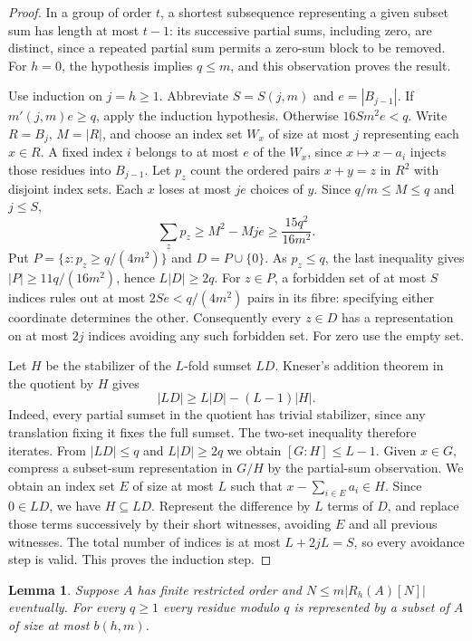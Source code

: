 \documentclass[11pt,reqno]{amsart}
\newtheorem{lemma}[theorem]{Lemma}
\theoremstyle{definition}
\theoremstyle{remark}
\begin{document}
\begin{proof}
In a group of order \(t\), a shortest subsequence representing a given
subset sum has length at most \(t-1\): its successive partial sums,
including zero, are distinct, since a repeated partial sum permits a
zero-sum block to be removed. For \(h=0\), the hypothesis implies
\(q\le m\), and this observation proves the result.

Use induction on \(j=h\ge1\). Abbreviate \(S=S(j,m)\) and \(e=|B_{j-1}|\).
If \(m'(j,m)e\ge q\), apply the induction hypothesis. Otherwise
\(16Sm^2e<q\). Write \(R=B_j\), \(M=|R|\), and choose an index set
\(W_x\) of size at most \(j\) representing each \(x\in R\).
A fixed index \(i\) belongs to at most \(e\) of the \(W_x\), since
\(x\mapsto x-a_i\) injects those residues into \(B_{j-1}\).
Let \(p_z\) count the ordered pairs \(x+y=z\) in \(R^2\) with disjoint
index sets. Each \(x\) loses at most \(je\) choices of \(y\). Since
\(q/m\le M\le q\) and \(j\le S\),
\[
 \sum_z p_z\ge M^2-Mje\ge\frac{15q^2}{16m^2}.
\]
Put \(P=\{z:p_z\ge q/(4m^2)\}\) and \(D=P\cup\{0\}\).
As \(p_z\le q\), the last inequality gives
\(|P|\ge 11q/(16m^2)\), hence \(L|D|\ge2q\).
For \(z\in P\), a forbidden set of at most \(S\) indices rules out at
most \(2Se<q/(4m^2)\) pairs in its fibre: specifying either coordinate
determines the other. Consequently every \(z\in D\) has a representation
on at most \(2j\) indices avoiding any such forbidden set. For zero use
the empty set.

Let \(H\) be the stabilizer of the \(L\)-fold sumset \(LD\).
Kneser's addition theorem in the quotient by \(H\) gives
\[
 |LD|\ge L|D|-(L-1)|H|.
\]
Indeed, every partial sumset in the quotient has trivial stabilizer,
since any translation fixing it fixes the full sumset. The two-set
inequality therefore iterates. From \(|LD|\le q\) and \(L|D|\ge 2q\)
we obtain \([G:H]\le L-1\). Given \(x\in G\), compress a subset-sum
representation in \(G/H\) by the partial-sum observation. We obtain an
index set \(E\) of size at most \(L\) such that \(x-\sum_{i\in E}a_i\in H\).
Since \(0\in LD\), we have \(H\subseteq LD\). Represent the difference
by \(L\) terms of \(D\), and replace those terms successively by their
short witnesses, avoiding \(E\) and all previous witnesses. The total
number of indices is at most \(L+2jL=S\), so every avoidance step is
valid. This proves the induction step.
\end{proof}

\begin{lemma}\label{lem:modular-lift}
Suppose \(A\) has finite restricted order and
\(N\le m|R_h(A)[N]|\) eventually. For every \(q\ge1\) every residue
modulo \(q\) is represented by a subset of \(A\) of size at most \(b(h,m)\).
\end{lemma}
\end{document}
